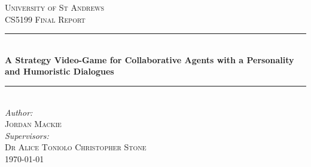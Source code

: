 \documentclass{article}
\begin{document}
\begin{titlepage}

\newcommand{\HRule}{\rule{\linewidth}{0.5mm}} %

\center %
 

\textsc{\LARGE University of St Andrews}\\[1.5cm] %
\textsc{\large CS5199 Final Report}\\[0.5cm] %


\HRule \\[0.4cm]
{ \huge \bfseries A Strategy Video-Game for Collaborative Agents with a Personality and Humoristic Dialogues}\\[0.4cm] %
\HRule \\[1.0cm]
 

\Large \emph{Author:}\\
 \textsc{Jordan Mackie}\\[1cm] %
\Large \emph{Supervisors:}\\
 \textsc{Dr Alice Toniolo \hspace{0.8cm}}
\textsc{Christopher Stone}\\[0.7cm] %
 

{\large \today}\\[1cm] %



\end{titlepage}
\end{document}
